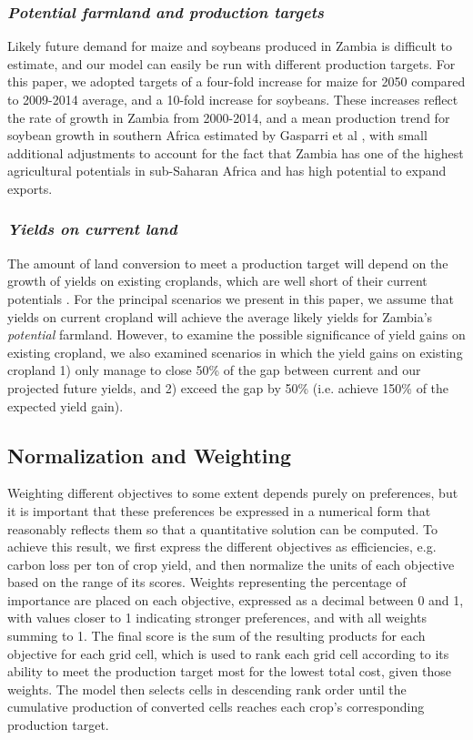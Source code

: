 \documentclass[a4paper]{article}
\begin{document}
{\subsubsection*{\emph{Potential farmland and production targets}}

Likely future demand for maize and soybeans produced in Zambia is difficult to estimate, and our model can easily be run with different production targets.  For this paper, we adopted targets of a four-fold increase for maize for 2050 compared to 2009-2014 average, and a 10-fold increase for soybeans.  These increases reflect the rate of growth in Zambia from 2000-2014, and a mean production trend for soybean growth in southern Africa estimated by Gasparri et al \citep{gasparri_emerging_2015}, with small additional adjustments to account for the fact that Zambia has one of the highest agricultural potentials in sub-Saharan Africa and has high potential to expand exports.  

\subsubsection*{\emph{Yields on current land}}

The amount of land conversion to meet a production target will depend on the growth of yields on existing croplands, which are well short of their current potentials \citep{waddington_getting_2010}.  For the principal scenarios we present in this paper, we assume that yields on current cropland will achieve the average likely yields for Zambia's \emph{potential} farmland.  However, to examine the possible significance of yield gains on existing cropland, we also examined scenarios in which the yield gains on existing cropland 1) only manage to close 50\% of the gap between current and our projected future yields, and 2) exceed the gap by 50\% (i.e. achieve 150\% of the expected yield gain). 

\subsection*{Normalization and Weighting} 

Weighting different objectives to some extent depends purely on preferences, but it is important that these preferences be expressed in a numerical form that reasonably reflects them so that a quantitative solution can be computed. To achieve this result, we first express the different objectives as efficiencies, e.g. carbon loss per ton of crop yield, and then normalize the units of each objective based on the range of its scores. Weights representing the percentage of importance are placed on each objective, expressed as a decimal between 0 and 1, with values closer to 1 indicating stronger preferences, and with all weights summing to 1. The final score is the sum of the resulting products for each objective for each grid cell, which is used to rank each grid cell according to its ability to meet the production target most for the lowest total cost, given those weights. The model then selects cells in descending rank order until the cumulative production of converted cells reaches each crop's corresponding production target.

}
\end{document}
